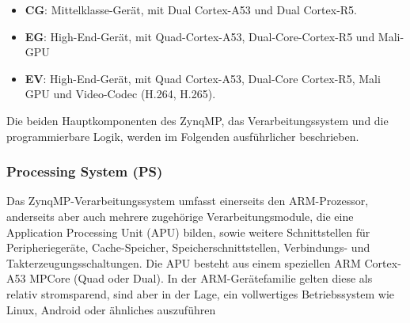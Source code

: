 \begin{itemize}
	\item \textbf{CG}: Mittelklasse-Gerät, mit Dual Cortex-A53 und Dual Cortex-R5.
	\item \textbf{EG}: High-End-Gerät, mit Quad-Cortex-A53, Dual-Core-Cortex-R5 und Mali-GPU
	\item \textbf{EV}: High-End-Gerät, mit Quad Cortex-A53, Dual-Core Cortex-R5, Mali GPU und Video-Codec (H.264, H.265).
\end{itemize}

Die beiden Hauptkomponenten des ZynqMP, das Verarbeitungssystem und die programmierbare Logik, werden im Folgenden ausführlicher beschrieben.

\subsubsection{Processing System (PS)}
Das ZynqMP-Verarbeitungssystem umfasst einerseits den ARM-Prozessor, anderseits aber auch mehrere zugehörige Verarbeitungsmodule, die eine Application Processing Unit (APU) bilden, sowie weitere Schnittstellen für Peripheriegeräte, Cache-Speicher, Speicherschnittstellen, Verbindungs- und Takterzeugungsschaltungen. Die APU besteht aus einem speziellen ARM Cortex-A53 MPCore (Quad oder Dual). In der ARM-Gerätefamilie gelten diese als relativ stromsparend, sind aber in der Lage, ein vollwertiges Betriebssystem wie Linux, Android oder ähnliches auszuführen

